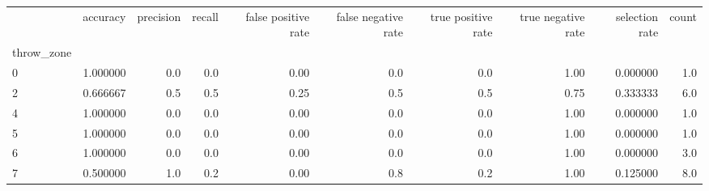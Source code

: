 \begin{tabular}{lrrrrrrrrr}
\toprule
{} &  accuracy &  precision &  recall &  false positive rate &  false negative rate &  true positive rate &  true negative rate &  selection rate &  count \\
throw\_zone &           &            &         &                      &                      &                     &                     &                 &        \\
\midrule
0          &  1.000000 &        0.0 &     0.0 &                 0.00 &                  0.0 &                 0.0 &                1.00 &        0.000000 &    1.0 \\
2          &  0.666667 &        0.5 &     0.5 &                 0.25 &                  0.5 &                 0.5 &                0.75 &        0.333333 &    6.0 \\
4          &  1.000000 &        0.0 &     0.0 &                 0.00 &                  0.0 &                 0.0 &                1.00 &        0.000000 &    1.0 \\
5          &  1.000000 &        0.0 &     0.0 &                 0.00 &                  0.0 &                 0.0 &                1.00 &        0.000000 &    1.0 \\
6          &  1.000000 &        0.0 &     0.0 &                 0.00 &                  0.0 &                 0.0 &                1.00 &        0.000000 &    3.0 \\
7          &  0.500000 &        1.0 &     0.2 &                 0.00 &                  0.8 &                 0.2 &                1.00 &        0.125000 &    8.0 \\
\bottomrule
\end{tabular}
